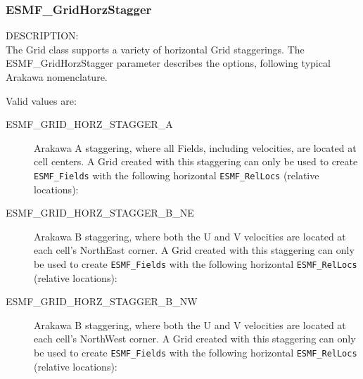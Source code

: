  \subsubsection{ESMF\_GridHorzStagger}

 {\sf DESCRIPTION:\\}
 The Grid class supports a variety of horizontal Grid staggerings.  The
 {ESMF\_GridHorzStagger} parameter describes the options, following typical
 Arakawa nomenclature.

 Valid values are:
 \begin{description}
    \item [ESMF\_GRID\_HORZ\_STAGGER\_A]
          Arakawa A staggering, where all Fields, including velocities, are
          located at cell centers.  A Grid created with this staggering can
          only be used to create {\tt ESMF\_Fields} with the following
          horizontal {\tt ESMF\_RelLocs} (relative locations):

    \item [ESMF\_GRID\_HORZ\_STAGGER\_B\_NE]
          Arakawa B staggering, where both the U and V velocities are located at
          each cell's NorthEast corner.  A Grid created with this staggering can
          only be used to create {\tt ESMF\_Fields} with the following
          horizontal {\tt ESMF\_RelLocs} (relative locations):

    \item [ESMF\_GRID\_HORZ\_STAGGER\_B\_NW]
          Arakawa B staggering, where both the U and V velocities are located at
          each cell's NorthWest corner.  A Grid created with this staggering can
          only be used to create {\tt ESMF\_Fields} with the following
          horizontal {\tt ESMF\_RelLocs} (relative locations):
 

\end{description}
